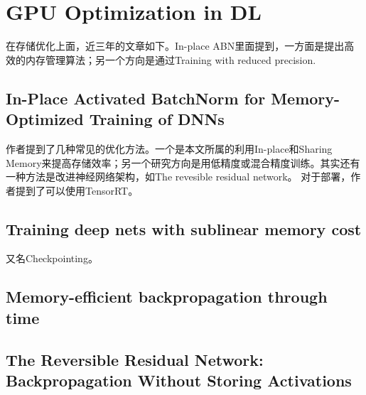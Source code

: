 \chapter{GPU Optimization in DL}

在存储优化上面，近三年的文章如下。In-place ABN里面提到，一方面是提出高效的内存管理算法；另一个方向是通过Training with reduced precision.



\section{In-Place Activated BatchNorm for Memory-Optimized Training of DNNs}

作者提到了几种常见的优化方法。一个是本文所属的利用In-place和Sharing Memory来提高存储效率；另一个研究方向是用低精度或混合精度训练。其实还有一种方法是改进神经网络架构，如The revesible residual network。 对于部署，作者提到了可以使用TensorRT。




\section{Training deep nets with sublinear memory cost}

又名Checkpointing。


\section{Memory-efficient backpropagation through time}


\section{The Reversible Residual Network: Backpropagation Without Storing Activations}

\section{}

